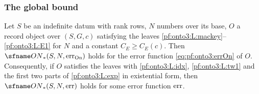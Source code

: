 \subsubsection{The global bound}

\begin{theorem}\label{pf:onto3:oncore}
Let $S$ be an indefinite datum with rank rows, $N$ numbers over its base, $O$ a record object over $(S,G,c)$
satisfying the leaves \ref{pf:onto3:L:mackey}--\ref{pf:onto3:L:E1} for $N$ and a constant $C_E\ge C_E(c)$. Then
$\ontothreeONw(S,N,\ontothreeerrOn)$ holds for the error function \eqref{eq:pf:onto3:errOn} of $O$. Consequently, if
$O$ satisfies the leaves with \ref{pf:onto3:L:idx}, \ref{pf:onto3:L:tw1} and the first two parts of
\ref{pf:onto3:L:exp} in existential form, then $\ontothreeONw(S,N,\ontothreeerr)$ holds for some error function
$\mathrm{err}$.
\end{theorem}

